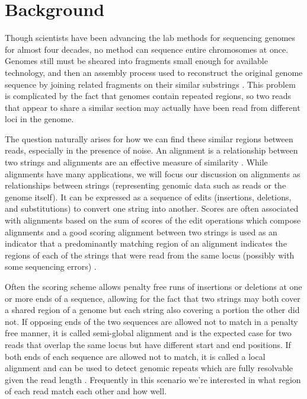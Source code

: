 \section{Background}


Though scientists have been advancing the lab methods for sequencing genomes for almost four decades, no method can sequence entire chromosomes at once. Genomes still must  be sheared into fragments small enough for available technology, and then an assembly process used to reconstruct the original genome sequence by joining related fragments on their similar substrings \cite{nagarajan2013sequence,staden1980new}.
This problem is complicated by the fact that genomes contain repeated regions, so two reads that appear to share a similar section may actually have been read from different loci in the genome.

The question naturally arises for how we can find these similar regions between reads, especially in the presence of noise.  
An alignment is a relationship between two strings and alignments are an effective measure of similarity \cite{needleman1970general}.  While alignments have many applications, we will focus our discussion on alignments as relationships between strings (representing genomic data such as reads or the genome itself).
It can be expressed as a sequence of edits (insertions, deletions, and substitutions) to convert one string into another.
Scores are often associated with alignments based on the sum of scores of the edit operations which compose alignments and a good scoring alignment between two strings is used as an indicator that a predominantly matching region of an alignment indicates the regions of each of the strings that were read from the same locus (possibly with some sequencing errors) .

Often the scoring scheme allows penalty free runs of insertions or deletions at one or more ends of a sequence, allowing for the fact that two strings may both cover a shared region of a genome but each string also covering a portion the other did not.
If opposing ends of the two sequences are allowed not to match in a penalty free manner, it is called semi-global alignment and is the expected case for two reads that overlap the same locus but have different start and end positions.
If both ends of each sequence are allowed not to match, it is called a local alignment and can be used to detect genomic repeats which are fully resolvable given the read length \cite{smith1981identification}.
Frequently in this scenario we're interested in what region of each read match each other and how well.

